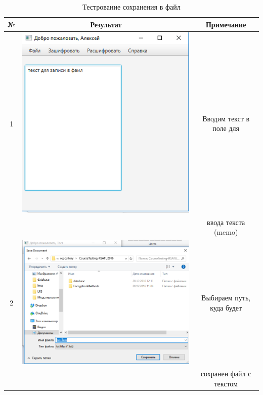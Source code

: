 \documentclass[a4paper,12pt]{article}
\begin{document}
\begin{table}[pt!]
	\caption{Тестрование сохранения в файл}
	\centering
	\begin{tabular}{|c|c|c|}
	\hline 
	№  & Результат & Примечание \\ 
	\hline 
	1 & \includegraphics[scale=0.3]{img/file/open/text_open4.png} & Вводим текст в поле для \\ && ввода текста (memo) \\
	\hline 
	2 & \includegraphics[scale=0.3]{img/file/save/text_path.png} & Выбираем путь, куда будет \\ && сохранен файл с текстом\\

\end{tabular}
\end{table}
\end{document}
